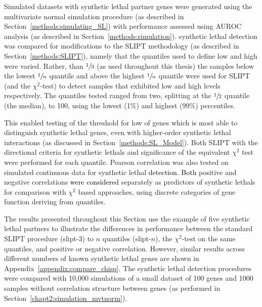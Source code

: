 Simulated datasets with \gls{synthetic lethal} partner genes were generated using the multivariate normal simulation procedure (as described in Section~\ref{methods:simulating_SL}) with performance assessed using \gls{AUROC} analysis (as described in Section~\ref{methods:simulation}). \Gls{synthetic lethal} detection was compared for modifications to the \gls{SLIPT} methodology (as described in Section~\ref{methods:SLIPT}), namely that the quantiles used to define low and high  were varied. Rather, than $\sfrac{1}{3}$ (as used throughout this thesis) the samples below the lowest $\sfrac{1}{n}$ quantile and above the highest $\sfrac{1}{n}$ quantile were used for \gls{SLIPT} (and the $\chi^2$-test) to detect samples that exhibited low and high  levels respectively. The quantiles tested ranged from two, splitting at the $\sfrac{1}{2}$ quantile (the median), to 100, using the lowest (1\%) and highest (99\%) percentiles.

This enabled testing of the threshold for low  of genes which is most able to distinguish \gls{synthetic lethal} genes, even with higher-order \gls{synthetic lethal} interactions (as discussed in Section~\ref{methods:SL_Model}). Both \gls{SLIPT} with the directional criteria for \glspl{synthetic lethal} and significance of the equivalent $\chi^2$ test were performed for each quantile. Pearson correlation was also tested on simulated continuous  data for \gls{synthetic lethal} \textcolor{black}{detection. Both} positive and negative correlations \textcolor{black}{were considered} separately as predictors of \glspl{synthetic lethal} for comparison with $\chi^2$ based approaches, using discrete categories of gene function deriving from quantiles. 

The results presented throughout this Section use the example of five \gls{synthetic lethal} partners to illustrate the differences in performance between the standard \gls{SLIPT} procedure (slipt-3) to $n$ quantiles (slipt-$n$), the $\chi^2$-test on the same quantiles, and positive or negative correlation. However, similar results across different numbers of known \gls{synthetic lethal} genes are shown in Appendix~\ref{appendix:compare_chisq}. The \gls{synthetic lethal} detection procedures were compared with 10,000 simulations of a small dataset of 100 genes and 1000 samples without correlation structure between genes (as performed in Section~\ref{chapt2:simulation_mvtnorm}).

